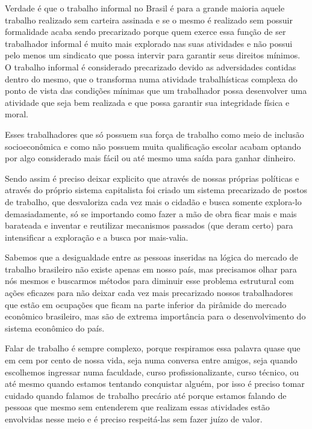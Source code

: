 Verdade é que o trabalho informal no Brasil é para a grande maioria aquele trabalho realizado sem carteira assinada e se o mesmo é realizado sem possuir formalidade acaba sendo precarizado porque quem exerce essa função de ser trabalhador informal é muito mais explorado nas suas atividades e não possui pelo menos um sindicato que possa intervir para garantir seus direitos mínimos. O trabalho informal é considerado precarizado devido as adversidades contidas dentro do mesmo, que o transforma numa atividade trabalhísticas complexa do ponto de vista das condições mínimas que um trabalhador possa desenvolver uma atividade que seja bem realizada e que possa garantir sua integridade física e moral. 

Esses trabalhadores que só possuem sua força de trabalho como meio de inclusão socioeconômica e como não possuem muita qualificação escolar acabam optando por algo considerado mais fácil ou até mesmo uma saída para ganhar dinheiro.

Sendo assim é preciso deixar explicito que através de nossas próprias políticas e através do próprio sistema capitalista foi criado um sistema precarizado de postos de trabalho, que desvaloriza cada vez mais o cidadão e busca somente explora-lo demasiadamente, só se importando como fazer a mão de obra ficar mais e mais barateada e inventar e reutilizar mecanismos passados (que deram certo) para intensificar a exploração e a busca por mais-valia.

Sabemos que a desigualdade entre as pessoas inseridas na lógica do mercado de trabalho brasileiro não existe apenas em nosso país, mas precisamos olhar para nós mesmos e buscarmos métodos para diminuir esse problema estrutural com ações eficazes para não deixar cada vez mais precarizado nossos trabalhadores que estão em ocupações que ficam na parte inferior da pirâmide do mercado econômico brasileiro, mas são de extrema importância para o desenvolvimento do sistema econômico do país.

Falar de trabalho é sempre complexo, porque respiramos essa palavra quase que em cem por cento de nossa vida, seja numa conversa entre amigos, seja quando escolhemos ingressar numa faculdade, curso profissionalizante, curso técnico, ou até mesmo quando estamos tentando conquistar alguém, por isso é preciso tomar cuidado quando falamos de trabalho precário até porque estamos falando de pessoas que mesmo sem entenderem que realizam essas atividades estão envolvidas nesse meio e é preciso respeitá-las sem fazer juízo de valor.
 
